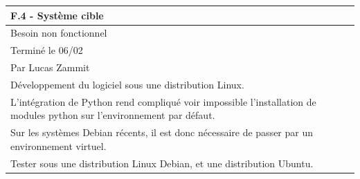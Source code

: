 \documentclass[a4paper,12pt]{article}
\begin{document}
\noindent
\setlength{\arrayrulewidth}{1.5pt}
\renewcommand{\arraystretch}{1.5}
\begin{tabularx}{\textwidth}{|X|}
    \hline
    \textbf{F.4 - Système cible
    }                                                                                               \\
    \hline
    Besoin non fonctionnel                                                                          \\
    \hline
    Terminé le 06/02                                                                                \\
    Par Lucas Zammit                                                                                \\
    \hline
    Développement du logiciel sous une distribution Linux.                                          \\
    L’intégration de Python rend compliqué voir impossible l’installation de modules
    python sur l’environnement par défaut.                                                          \\
    Sur les systèmes Debian récents, il est donc nécessaire de passer par un environnement virtuel. \\
    \arrayrulecolor{MediumAquamarine}\hline
    \arrayrulecolor{RoyalBlue}
    Tester sous une distribution Linux Debian, et une distribution Ubuntu.                          \\
    \hline
\end{tabularx}

\vspace{1cm}
\end{document}
